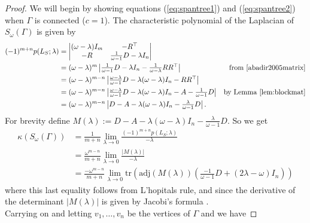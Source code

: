 \documentclass[12pt]{report}
\theoremstyle{definition}
\begin{document}
\begin{proof}
    We will begin by showing equations (\ref{eq:spantree1}) and (\ref{eq:spantree2}) when $\Gamma$ is connected ($c=1$). The characteristic polynomial of the Laplacian of $S_\omega(\Gamma)$ is given by
    \begin{align*}
        (-1)^{m+n}p(L_S;\lambda)&= \begin{vmatrix}
                            (\omega-\lambda)I_m & -R^\top \\
                            -R & \frac{1}{\omega-1}D-\lambda I_n
                        \end{vmatrix} \\
        &= (\omega - \lambda)^m \begin{vmatrix} \frac{1}{\omega-1}D-\lambda I_n -\frac{1}{\omega - \lambda}RR^\top\end{vmatrix} & \mbox{from \cite[p. 114]{abadir2005matrix}}\\
        &= (\omega - \lambda)^{m-n} \begin{vmatrix} \frac{\omega-\lambda}{\omega-1}D-\lambda(\omega -\lambda) I_n -RR^\top\end{vmatrix} \\
        &= (\omega - \lambda)^{m-n} \begin{vmatrix} \frac{\omega-\lambda}{\omega-1}D-\lambda(\omega -\lambda) I_n -A-\frac{1}{\omega -1} D\end{vmatrix} & \mbox{by Lemma \ref{lem:blockmat}}\\
        &= (\omega - \lambda)^{m-n} \begin{vmatrix}D-A-\lambda(\omega -\lambda) I_n -\frac{\lambda}{\omega -1} D\end{vmatrix}.
    \end{align*}
    For brevity define $M(\lambda):=D-A-\lambda(\omega -\lambda) I_n -\frac{\lambda}{\omega -1} D$. So we get
    \begin{align*}
        \kappa(S_\omega(\Gamma))&= \frac{1}{m+n}\lim_{\lambda \to 0}\frac{(-1)^{m+n}p(L_S;\lambda)}{-\lambda} \\
        &= \frac{\omega^{m-n}}{m+n}\lim_{\lambda \to 0}\frac{|M(\lambda) |}{-\lambda} \\
        &= \frac{-\omega^{m-n}}{m+n}\lim_{\lambda \to 0}\text{tr}\left(\text{adj}(M(\lambda)) \left(\frac{-1}{\omega -1}D+(2\lambda -\omega)I_n\right)\right) 
        \end{align*}
        where this last equality follows from L'hopitals rule, and since the derivative of the determinant $|M(\lambda)|$ is given by Jacobi's formula \cite[p. 149]{magnus}.\\Carrying on and letting $v_1,\ldots,v_n$ be the vertices of $\Gamma$ and we have

\end{proof}
\end{document}
